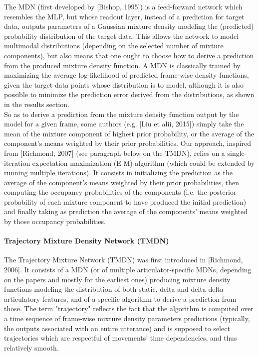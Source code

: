 The MDN (first developed by [Bishop, 1995]) is a feed-forward network which resembles the MLP, but whose readout layer, instead of a prediction for target data, outputs parameters of a Gaussian mixture density modeling the (predicted) probability distribution of the target data. This allows the network to model multimodal distributions (depending on the selected number of mixture components), but also means that one ought to choose how to derive a prediction from the produced mixture density function. A MDN is classically trained by maximizing the average log-likelihood of predicted frame-wise density functions, given the target data points whose distribution is to model, although it is also possible to minimize the prediction error derived from the distributions, as shown in the results section.\\

So as to derive a prediction from the mixture density function output by the model for a given frame, some authors (e.g. [Liu et alii, 2015]) simply take the mean of the mixture component of highest prior probability, or the average of the component's means weighted by their prior probabilities. Our approach, inspired from [Richmond, 2007] (see paragraph below on the TMDN), relies on a single-iteration expectation maximization (E-M) algorithm (which could be extended by running multiple iterations). It consists in initializing the prediction as the average of the component's means weighted by their prior probabilities, then computing the occupancy probabilities of the components (i.e. the posterior probability of each mixture component to have produced the initial prediction) and finally taking as prediction the average of the components' means weighted by those occupancy probabilities.\\

\paragraph{Trajectory Mixture Density Network (TMDN)}

The Trajectory Mixture Network (TMDN) was first introduced in [Richmond, 2006]. It consists of a MDN (or of multiple articulator-specific MDNs, depending on the papers and mostly for the earliest ones) producing mixture density functions modeling the distribution of both static, delta and delta-delta articulatory features, and of a specific algorithm to derive a prediction from those. The term "trajectory" reflects the fact that the algorithm is computed over a time sequence of frame-wise mixture density parameters predictions (typically, the outputs associated with an entire utterance) and is supposed to select trajectories which are respectful of movements' time dependencies, and thus relatively smooth.\\

